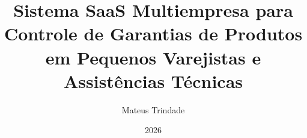 \documentclass[pt,oneside,onehalfspacing,bsc]{ifgtcc}
\title{Sistema SaaS Multiempresa para Controle de
	Garantias de Produtos em Pequenos Varejistas e
	Assistências Técnicas}
\date{2026}
\author{Mateus Trindade}
\begin{document}
\frontmatter

\frontpage

% 		

\presentationpage


%     

% 	




% 	
\end{document}
